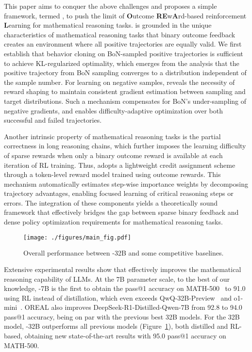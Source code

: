 This paper aims to conquer the above challenges and proposes a simple framework, termed \methodname{}, to push the limit of \textbf{O}utcome \textbf{RE}w\textbf{A}rd-based reinforcement \textbf{L}earning for mathematical reasoning tasks. \methodname{} is grounded in the unique characteristics of mathematical reasoning tasks that binary outcome feedback creates an environment where all positive trajectories are equally valid. We first establish that behavior cloning on BoN-sampled positive trajectories is sufficient to achieve KL-regularized optimality, which emerges from the analysis that the positive trajectory from BoN sampling converges to a distribution independent of the sample number. For learning on negative samples, \methodname{} reveals the necessity of reward shaping to maintain consistent gradient estimation between sampling and target distributions. Such a mechanism compensates for BoN's under-sampling of negative gradients, and enables difficulty-adaptive optimization over both successful and failed trajectories.

Another intrinsic property of mathematical reasoning tasks is the partial correctness in long reasoning chains, which further imposes the learning difficulty of sparse rewards when only a binary outcome reward is available at each iteration of RL training.
Thus, \methodname{} adopts a lightweight credit assignment scheme through a token-level reward model trained using outcome rewards. This mechanism automatically estimates step-wise importance weights by decomposing trajectory advantages, enabling focused learning of critical reasoning steps or errors.
The integration of these components yields a theoretically sound framework that effectively bridges the gap between sparse binary feedback and dense policy optimization requirements for mathematical reasoning tasks.

\begin{figure}[t]
    \centering
    \texttt{[image: ./figures/main\_fig.pdf]}
    \caption{Overall performance between \methodname{}-32B and some competitive baselines.}
    \vspace{-16pt}
    \label{fig: main_fig}
\end{figure}

Extensive experimental results show that \methodname{} effectively improves the mathematical reasoning capability of LLMs.
At the 7B parameter scale, to the best of our knowledge, \methodname{}-7B is the first to obtain the pass@1 accuracy on MATH-500~\cite{hendrycks2021measuring} to 91.0 using RL instead of distillation, which even exceeds QwQ-32B-Preview~\cite{qwq-32b-preview} and o1-mini~\cite{openai2024learning}.
OREAL also improves DeepSeek-R1-Distilled-Qwen-7B from 92.8 to 94.0 pass@1 accuracy, being on par with the previous best 32B models.
For the 32B model, \methodname{}-32B outperforms all previous models (Figure~\ref{fig: main_fig}), both distilled and RL-based, obtaining new state-of-the-art results with 95.0 pass@1 accuracy on MATH-500.
